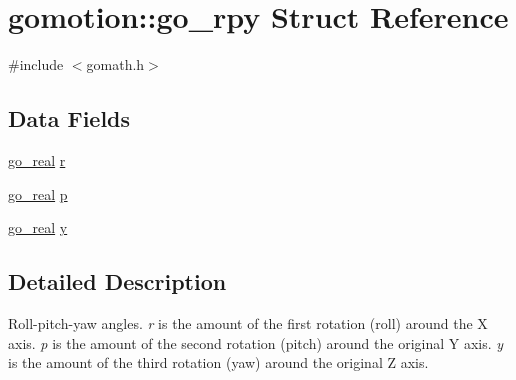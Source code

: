 \hypertarget{structgomotion_1_1go__rpy}{\section{gomotion\-:\-:go\-\_\-rpy Struct Reference}
\label{structgomotion_1_1go__rpy}
}


{\ttfamily \#include $<$gomath.\-h$>$}

\subsection*{Data Fields}
\begin{DoxyCompactItemize}
\item 
\hyperlink{gotypes_8h_afd666a2393eebd71ee455846ac9def9b}{go\-\_\-real} \hyperlink{structgomotion_1_1go__rpy_a37241d3fe9431d408add42f27e395154}{r}
\item 
\hyperlink{gotypes_8h_afd666a2393eebd71ee455846ac9def9b}{go\-\_\-real} \hyperlink{structgomotion_1_1go__rpy_a309f825360e8b7b41577208d606f3e4d}{p}
\item 
\hyperlink{gotypes_8h_afd666a2393eebd71ee455846ac9def9b}{go\-\_\-real} \hyperlink{structgomotion_1_1go__rpy_a38a63e8c2a10283b56c3a697f142f8e2}{y}
\end{DoxyCompactItemize}


\subsection{Detailed Description}
Roll-\/pitch-\/yaw angles. {\itshape r} is the amount of the first rotation (roll) around the X axis. {\itshape p} is the amount of the second rotation (pitch) around the original Y axis. {\itshape y} is the amount of the third rotation (yaw) around the original Z axis. 

